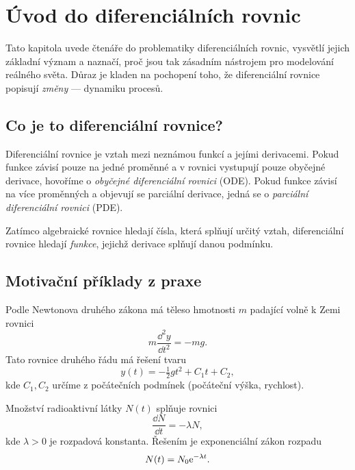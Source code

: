\section{Úvod do diferenciálních rovnic}
\label{sec:uvod-diffeq}

Tato kapitola uvede čtenáře do problematiky diferenciálních rovnic, vysvětlí jejich základní význam a naznačí, proč jsou tak zásadním nástrojem pro modelování reálného světa. 
Důraz je kladen na pochopení toho, že diferenciální rovnice popisují \emph{změny} — dynamiku procesů.

\spc

\subsection{Co je to diferenciální rovnice?}
\begin{definition}
Diferenciální rovnice je vztah mezi neznámou funkcí a jejími derivacemi. 
Pokud funkce závisí pouze na jedné proměnné a v rovnici vystupují pouze obyčejné derivace, hovoříme o \emph{obyčejné diferenciální rovnici} (ODE). 
Pokud funkce závisí na více proměnných a objevují se parciální derivace, jedná se o \emph{parciální diferenciální rovnici} (PDE).
\end{definition}

\begin{remark}
Zatímco algebraické rovnice hledají čísla, která splňují určitý vztah, diferenciální rovnice hledají \emph{funkce}, jejichž derivace splňují danou podmínku.
\end{remark}

\spc

\subsection{Motivační příklady z praxe}

\begin{example}
Podle Newtonova druhého zákona má těleso hmotnosti $m$ padající volně k Zemi rovnici
\[
m \frac{\dd^2 y}{\dd t^2} = -mg.
\]
Tato rovnice druhého řádu má řešení tvaru
\[
y(t) = -\tfrac{1}{2} g t^2 + C_1 t + C_2,
\]
kde $C_1, C_2$ určíme z počátečních podmínek (počáteční výška, rychlost).
\end{example}

\begin{example}
Množství radioaktivní látky $N(t)$ splňuje rovnici
\[
\frac{\dd N}{\dd t} = -\lambda N,
\]
kde $\lambda > 0$ je rozpadová konstanta. 
Řešením je exponenciální zákon rozpadu
\[
N(t) = N_0 \mathrm{e}^{-\lambda t}.
\]
\end{example}

